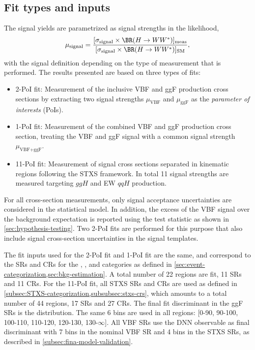 \subsection{Fit types and inputs}
The signal yields are parametrized as signal strengths in the likelihood, 
\begin{equation}
    \label{eq:incl-ggF-VBF-signal-strengths}
    \mu_{\text{signal}} = \frac{ [ \sigma_{\text{signal}}  \times \BR(H \to WW^*) ]_\text{meas} } { [ \sigma_{\text{signal}} \times \BR(H \to WW^*) ]_\text{SM}}, 
\end{equation}
with the signal definition depending on the type of measurement that is performed.
The results presented are based on three types of fits:
\begin{itemize}
    \item 2-PoI fit: Measurement of the inclusive VBF and ggF production cross sections by extracting two signal strengths $\mu_{\text{VBF}}$ and $\mu_{\text{ggF}}$ as the \emph{parameter of interests} (PoIs).
    \item 1-PoI fit: Measurement of the combined VBF and ggF production cross section, treating the VBF and ggF signal with a common signal strength $\mu_{\text{VBF+ggF}}$.
    \item 11-PoI fit: Measurement of signal cross sections separated in kinematic regions following the STXS framework. In total 11 signal strengths are measured targeting $ggH$ and EW $qqH$ production.
\end{itemize}
For all cross-section measurements, only signal acceptance uncertainties are considered in the statistical model. 
In addition, the excess of the VBF signal over the background expectation is reported using the test statistic as shown in \cref{sec:hypothesis-testing}. Two 2-PoI fits are performed for this purpose that also include signal cross-section uncertainties in the signal templates. 

The fit inputs used for the 2-PoI fit and 1-PoI fit are the same, and correspond to the SRs and CRs for the \ZeroJet, \OneJet, and \TwoJet categories as defined in \cref{sec:event-categorization,sec:bkg-estimation}. A total number of 22 regions are fit, 11 SRs and 11 CRs.
For the 11-PoI fit, all STXS SRs and CRs are used as defined in \cref{subsec:STXS-categorization,subsubsec:stxs-crs}, which amounts to a total number of 44 regions, 17 SRs and 27 CRs. 
The final fit discriminant in the ggF SRs is the \mT distribution. The same 6 bins are used in all regions: [0-90, 90-100, 100-110, 110-120, 120-130, 130-$\infty$]. 
All VBF SRs use the DNN observable as final discriminant with 7 bins in the nominal VBF SR and 4 bins in the STXS SRs, as described in \cref{subsec:fina-model-validation}.

